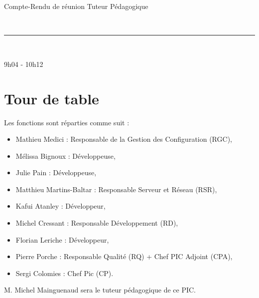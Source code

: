 \documentclass [a4paper] {article}
\begin{document}
\begin{center}
\huge{Compte-Rendu de réunion Tuteur Pédagogique}
\end{center}

~~\newline

\hrule
~~\newline

\hfill   
\hfill 9h04 - 10h12 %


\rfoot{\thepage{}} %



\section{Tour de table}
Les fonctions sont réparties comme suit :
\begin{itemize}
	\item Mathieu Medici : Responsable de la Gestion des Configuration (RGC),
	\item Mélissa Bignoux : Développeuse,
	\item Julie Pain : Développeuse,
	\item Matthieu Martins-Baltar : Responsable Serveur et Réseau (RSR),
	\item Kafui Atanley : Développeur,
	\item Michel Cressant : Responsable Développement (RD),
	\item Florian Leriche : Développeur,
	\item Pierre Porche : Responsable Qualité (RQ) + Chef PIC Adjoint (CPA),
	\item Sergi Colomies : Chef Pic (CP).
\end{itemize}
M. Michel Mainguenaud sera le tuteur pédagogique de ce PIC.
\end{document}
